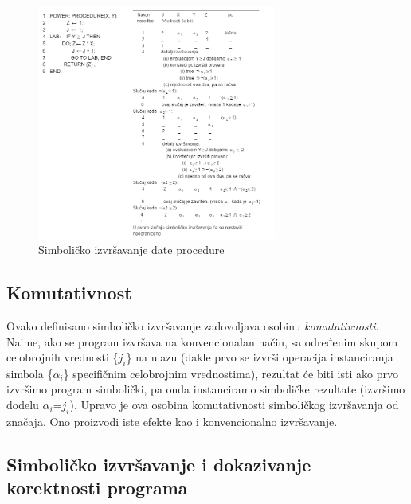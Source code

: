 \documentclass[a4paper]{article}
\begin{document}
\begin{figure}[h!]
\begin{center}
\includegraphics[width=0.7\textwidth]{slika2}
\end{center}
\caption{Simboličko izvršavanje date procedure \cite{simbExec}}
\label{fig:slika2}
\end{figure}


\subsection{Komutativnost}
\label{subsec:podnaslov2}

Ovako definisano simboličko izvršavanje zadovoljava osobinu \textit{komutativnosti}. Naime, ako se program izvršava na konvencionalan način, sa određenim skupom celobrojnih vrednosti \{$j_i$\} na ulazu (dakle prvo se izvrši operacija instanciranja simbola \{$\alpha_i$\} specifičnim celobrojnim vrednostima), rezultat će biti isti ako prvo izvršimo program simbolički, pa onda instanciramo simboličke rezultate (izvršimo dodelu $\alpha_i$=$j_i$). Upravo je ova osobina komutativnosti simboličkog izvršavanja od značaja. Ono proizvodi iste efekte kao i konvencionalno izvršavanje.

\subsection{Simboličko izvršavanje i dokazivanje korektnosti programa}
\label{subsec:podnaslov3}
\end{document}
